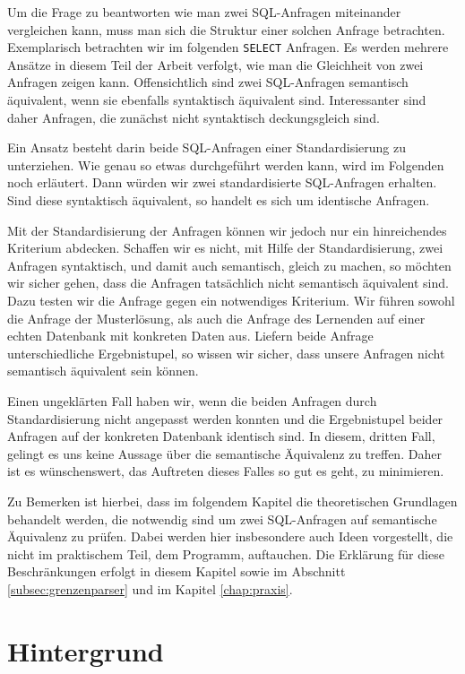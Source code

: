 Um die Frage zu beantworten wie man zwei SQL-Anfragen miteinander vergleichen kann, muss man sich die Struktur einer solchen Anfrage betrachten. Exemplarisch betrachten wir im folgenden \verb|SELECT| Anfragen. Es werden mehrere Ansätze in diesem Teil der Arbeit verfolgt, wie man die Gleichheit von zwei Anfragen zeigen kann. Offensichtlich sind zwei SQL-Anfragen semantisch äquivalent, wenn sie ebenfalls syntaktisch äquivalent sind. Interessanter sind daher Anfragen, die zunächst nicht syntaktisch deckungsgleich sind. 

Ein Ansatz besteht darin beide SQL-Anfragen einer Standardisierung zu unterziehen. Wie genau so etwas durchgeführt werden kann, wird im Folgenden noch erläutert. Dann würden wir zwei standardisierte SQL-Anfragen erhalten. Sind diese syntaktisch äquivalent, so handelt es sich um identische Anfragen. 

Mit der Standardisierung der Anfragen können wir jedoch nur ein hinreichendes Kriterium abdecken. Schaffen wir es nicht, mit Hilfe der Standardisierung, zwei Anfragen syntaktisch, und damit auch semantisch, gleich zu machen, so möchten wir sicher gehen, dass die Anfragen tatsächlich nicht semantisch äquivalent sind. Dazu testen wir die Anfrage gegen ein notwendiges Kriterium. Wir führen sowohl die Anfrage der Musterlösung, als auch die Anfrage des Lernenden auf einer echten Datenbank mit konkreten Daten aus. Liefern beide Anfrage unterschiedliche Ergebnistupel, so wissen wir sicher, dass unsere Anfragen nicht semantisch äquivalent sein können. 

Einen ungeklärten Fall haben wir, wenn die beiden Anfragen durch Standardisierung nicht angepasst werden konnten und die Ergebnistupel beider Anfragen auf der konkreten Datenbank identisch sind. In diesem, dritten Fall, gelingt es uns keine Aussage über die semantische Äquivalenz zu treffen. Daher ist es wünschenswert, das Auftreten dieses Falles so gut es geht, zu minimieren.

Zu Bemerken ist hierbei, dass im folgendem Kapitel die theoretischen Grundlagen behandelt werden, die notwendig sind um zwei SQL-Anfragen auf semantische Äquivalenz zu prüfen. Dabei werden hier insbesondere auch Ideen vorgestellt, die nicht im praktischem Teil, dem Programm, auftauchen. Die Erklärung für diese Beschränkungen erfolgt in diesem Kapitel sowie im Abschnitt \ref{subsec:grenzenparser} und im Kapitel \ref{chap:praxis}.

\section{Hintergrund}

